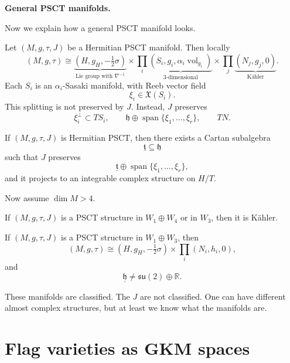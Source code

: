 \medskip\noindent
{\bf General PSCT manifolds.}

Now we explain how a general PSCT
manifold looks.

\begin{theorem}
\label{theorem-let-m}
Let $(M,g,\tau,J)$ be a Hermitian PSCT
manifold.
Then locally
\[
(M,g,\tau)\cong
\underbrace{(H,g_H,-\tfrac12\sigma)}
_{\text{Lie group with }\nabla^{-1}}
\times
\prod_i
\underbrace{(S_i,g_i,\alpha_i
\operatorname{vol}_{g_i})}
_{\text{3-dimensional}}
\times
\prod_j
\underbrace{(N_j,g_j,0)}
_{\text{K\"ahler}}.
\]
Each $S_i$ is an $\alpha_i$-Sasaki
manifold, with Reeb vector field
\[
\xi_i\in\mathfrak X(S_i).
\]
This splitting is not preserved by $J$.
Instead, $J$ preserves
\[
\xi_i^\perp\subset TS_i,
\qquad
\mathfrak h\oplus
\operatorname{span}
\{\xi_1,\dots,\xi_r\},
\qquad
TN.
\]
\end{theorem}

\begin{theorem}
If $(M,g,\tau,J)$ is Hermitian PSCT,
then there exists a Cartan subalgebra
\[
\underline{\mathfrak t}\subseteq
\mathfrak h
\]
such that $J$ preserves
\[
\underline{\mathfrak t}\oplus
\operatorname{span}
\{\xi_1,\dots,\xi_r\},
\]
and it projects to an integrable
complex structure on $H/T$.
\end{theorem}

Now assume $\dim M>4$.

\begin{theorem}
\label{theorem-m-g2}
If $(M,g,\tau,J)$ is a PSCT structure
in $W_1\oplus W_4$ or in $W_3$, then
it is K\"ahler.
\end{theorem}

\begin{theorem}
\label{theorem-m-g2-duplicate-2}
If $(M,g,\tau,J)$ is a PSCT structure
in $W_1\oplus W_3$, then
\[
(M,g,\tau)\cong
(H,g_H,-\tfrac12\sigma)
\times
\prod_i (N_i,h_i,0),
\]
and
\[
\underline{\mathfrak h}
\neq
\mathfrak{su}(2)\oplus\mathbb R.
\]
\end{theorem}

These manifolds are classified.
The $J$ are not classified.
One can have different almost
complex structures, but at least
we know what the manifolds are.

\section{Flag varieties as GKM
spaces}
\label{section-flag-varieties-as-gkm-
spaces}

